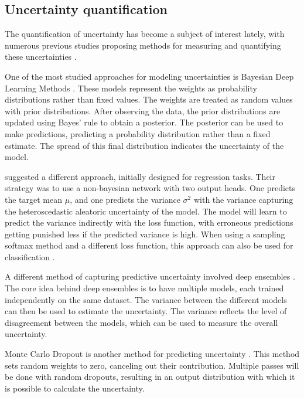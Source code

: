 \subsection{Uncertainty quantification}

The quantification of uncertainty has become a subject of interest lately, with numerous previous studies proposing methods for measuring and quantifying these uncertainties \citep{abdar2021review}.

One of the most studied approaches for modeling uncertainties is Bayesian Deep Learning Methods \citep{kendall2017uncertainties, chen2020uncertainty}. These models represent the weights as probability distributions rather than fixed values. The weights are treated as random values with prior distributions. After observing the data, the prior distributions are updated using Bayes' rule to obtain a posterior. The posterior can be used to make predictions, predicting a probability distribution rather than a fixed estimate. The spread of this final distribution indicates the uncertainty of the model.

\cite{nix1994estimating} suggested a different approach, initially designed for regression tasks. Their strategy was to use a non-bayesian network with two output heads. One predicts the target mean $\mu$, and one predicts the variance $\sigma^2$ with the variance capturing the heteroscedastic aleatoric uncertainty of the model. The model will learn to predict the variance indirectly with the loss function, with erroneous predictions getting punished less if the predicted variance is high. When using a sampling softmax method and a different loss function, this approach can also be used for classification \citep{kendall2017uncertainties}.

A different method of capturing predictive uncertainty involved deep ensembles \citep{lakshminarayanan2017simple}. The core idea behind deep ensembles is to have multiple models, each trained independently on the same dataset. The variance between the different models can then be used to estimate the uncertainty. The variance reflects the level of disagreement between the models, which can be used to measure the overall uncertainty.

Monte Carlo Dropout is another method for predicting uncertainty \citep{gal2016dropout}. This method sets random weights to zero, canceling out their contribution. Multiple passes will be done with random dropouts, resulting in an output distribution with which it is possible to calculate the uncertainty.

